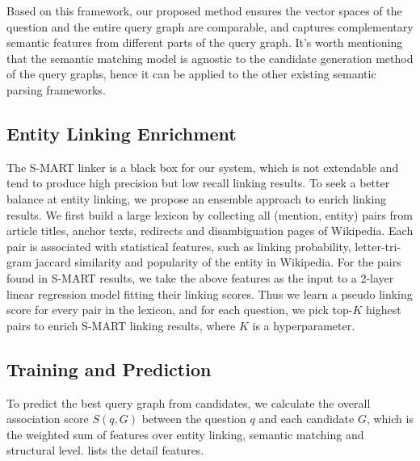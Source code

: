 Based on this framework, our proposed method ensures
the vector spaces of the question and the entire query graph are comparable,
and captures complementary semantic features from different parts of the query graph.
It's worth mentioning that the semantic matching model 
is agnostic to the candidate generation method of the query graphs,
hence it can be applied to the other existing semantic parsing frameworks.


\subsection{Entity Linking Enrichment}
\label{sec:ensemble}

The S-MART linker is a black box for our system,
which is not extendable and tend to produce high precision but low recall linking results.
To seek a better balance at entity linking,
we propose an ensemble approach to enrich linking results.
We first build a large lexicon by collecting all (mention, entity) pairs from
article titles, anchor texts, redirects and disambiguation pages of Wikipedia.
Each pair is associated with statistical features, such as linking probability,
letter-tri-gram jaccard similarity and popularity of the entity in Wikipedia.
For the pairs found in S-MART results, we take the above features as the input
to a 2-layer linear regression model fitting their linking scores.
Thus we learn a pseudo linking score for every pair in the lexicon,
and for each question, we pick top-$K$ highest pairs to enrich S-MART linking results,
where $K$ is a hyperparameter.


\subsection{Training and Prediction}
\label{sec:train}


To predict the best query graph from candidates,
we calculate the overall association score $S(q, G)$ between the question $q$ and each candidate $G$,
which is the weighted sum of features over entity linking, semantic matching and structural level.
 lists the detail features.



